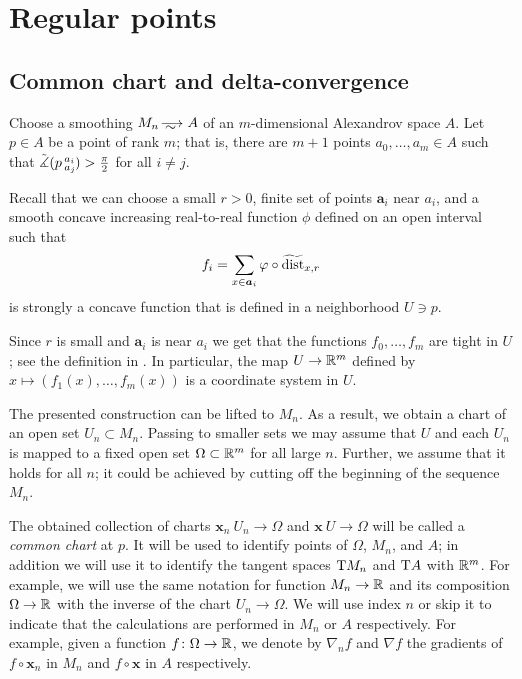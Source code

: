 \section{Regular points}\label{sec:ref}

\subsection{Common chart and delta-convergence}

Choose a smoothing $M_n\smooths{} A$ of an $m$-dimensional Alexandrov space $A$.
Let $p\in A$ be a point of rank $m$; that is, there are $m+1$ points $a_0,\dots, a_m\in A$ such that 
$\tilde\measuredangle(p\,{}^{a_i}_{a_j}\hspace{-0.2ex})>\tfrac\pi2$ for all $i\ne j$.

Recall \cite[Sec. 7]{petrunin-conc} that we can choose a small $r>0$,
finite set of points $\bm{a}_i$ near $a_i$,
and a smooth concave increasing real-to-real function $\phi$ defined on an open interval such that 
\[f_i=\sum_{x\in \bm{a}_i}\varphi\circ\widetilde{\operatorname{\rm dist}}_{x,r}\]
is strongly a concave function that is defined in a neighborhood $U\ni p$.

Since $r$ is small and $\bm{a}_i$ is near $a_i$ we get that the functions $f_0, \dots, f_m$ are tight in $U$; see the definition in \cite{petrunin-conc}.
In particular, the map $U\to\mathbb{R}^m$ defined by $x\mapsto (f_1(x),\dots,f_m(x))$ is a coordinate system in $U$.

The presented construction can be lifted to $M_n$.
As a result, we obtain a chart of an open set $U_n\subset M_n$.
Passing to smaller sets we may assume that $U$ and each $U_n$ is mapped to a fixed open set $\Omega\subset\mathbb{R}^m$ for all large $n$.
Further, we assume that it holds for all $n$; it could be achieved by cutting off the beginning of the sequence $M_n$.

The obtained collection of charts $\bm{x}_n\:U_n\to \Omega$ and $\bm{x}\:U\to \Omega$ will be called a \emph{common chart} at $p$.
It will be used to identify points of $\Omega$, $M_n$, and $A$; 
in addition we will use it to identify the tangent spaces $\mathrm{T} M_n$ and $\mathrm{T} A$ with $\mathbb{R}^m$.
For example, we will use the same notation for function $M_n\to \mathbb{R}$ and its composition $\Omega\to \mathbb{R}$ with the inverse of the chart $U_n\to \Omega$.
We will use index $n$ or skip it to indicate that the calculations are performed in $M_n$ or $A$ respectively.
For example, given a function $f\colon\Omega\to \mathbb{R}$, we denote by $\nabla_nf$ and $\nabla f$ the gradients of $f\circ \bm{x}_n$ in $M_n$ and $f\circ \bm{x}$ in $A$ respectively.

